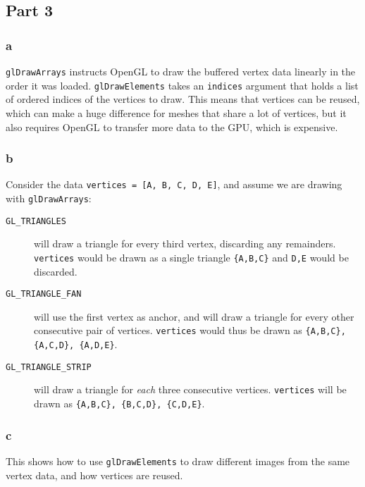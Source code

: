 \subsection{Part 3}

\subsubsection{a}
\texttt{glDrawArrays} instructs OpenGL to draw the buffered vertex data linearly in the order it was loaded. \texttt{glDrawElements} takes an \texttt{indices} argument that holds a list of ordered indices of the vertices to draw. This means that vertices can be reused, which can make a huge difference for meshes that share a lot of vertices, but it also requires OpenGL to transfer more data to the GPU, which is expensive.

\subsubsection{b}
Consider the data \texttt{vertices = [A, B, C, D, E]}, and assume we are drawing with \texttt{glDrawArrays}:

\begin{description}
\item[\texttt{GL\_TRIANGLES}]
  will draw a triangle for every third vertex, discarding any remainders. \texttt{vertices} would be drawn as a single triangle \texttt{\{A,B,C\}} and \texttt{D,E} would be discarded.

\item[\texttt{GL\_TRIANGLE\_FAN}] will use the first vertex as anchor, and will draw a triangle for every other consecutive pair of vertices. \texttt{vertices} would thus be drawn as \texttt{\{A,B,C\}, \{A,C,D\}, \{A,D,E\}}.

\item[\texttt{GL\_TRIANGLE\_STRIP}]
   will draw a triangle for \textit{each} three consecutive vertices. \texttt{vertices} will be drawn as \texttt{\{A,B,C\}, \{B,C,D\}, \{C,D,E\}}.
\end{description}

\subsubsection{c}
This shows how to use \texttt{glDrawElements} to draw different images from the same vertex data, and how vertices are reused.

